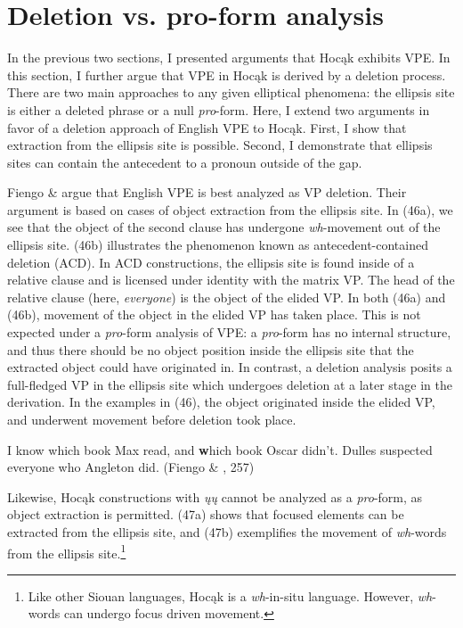 \documentclass[output=paper]{LSP/langsci}
\begin{document}
\section{Deletion vs. pro-form analysis}

In the previous two sections, I presented arguments that Hocąk exhibits VPE. In this section, I further argue that VPE in Hocąk is derived by a deletion process. There are two main approaches to any given elliptical phenomena: the ellipsis site is either a deleted phrase or a null \emph{pro}-form. Here, I extend two arguments in favor of a deletion approach of English VPE to Hocąk. First, I show that extraction from the ellipsis site is possible. Second, I demonstrate that ellipsis sites can contain the antecedent to a pronoun outside of the gap.

Fiengo \& \citet{May1994} argue that English VPE is best analyzed as VP deletion. Their argument is based on cases of object extraction from the ellipsis site. In (46a), we see that the object of the second clause has undergone \emph{wh}-movement out of the ellipsis site. (46b) illustrates the phenomenon known as antecedent-contained deletion (ACD). In ACD constructions, the ellipsis site is found inside of a relative clause and is licensed under identity with the matrix VP. The head of the relative clause (here, \emph{everyone}) is the object of the elided VP. In both (46a) and (46b), movement of the object in the elided VP has taken place. This is not expected under a \emph{pro}-form analysis of VPE: a \emph{pro}-form has no internal structure, and thus there should be no object position inside the ellipsis site that the extracted object could have originated in. In contrast, a deletion analysis posits a full-fledged VP in the ellipsis site which undergoes deletion at a later stage in the derivation. In the examples in (46), the object originated inside the elided VP, and underwent movement before deletion took place.

\begin{exe}
\ex
\begin{xlist}
\ex
I know which book Max read, and {\textbf which book} Oscar didn't.
\ex
Dulles suspected everyone who Angleton did. (Fiengo \& \citealt[229]{May1994}, 257)
\end{xlist}
\end{exe}

Likewise, Hocąk constructions with \emph{ųų} cannot be analyzed as a \emph{pro}-form, as object extraction is permitted. (47a) shows that focused elements can be extracted from the ellipsis site, and (47b) exemplifies the movement of \emph{wh}-words from the ellipsis site.\footnote{Like other Siouan languages, Hocąk is a \emph{wh}-in-situ language. However, \emph{wh}-words can undergo focus driven movement.}
\end{document}
